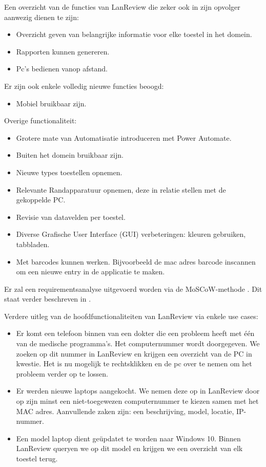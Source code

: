 Een overzicht van de functies van LanReview die zeker ook in zijn opvolger aanwezig dienen te zijn:
\begin{itemize}
    \item  Overzicht geven van belangrijke informatie voor elke toestel in het domein.
    \item Rapporten kunnen genereren.
\item Pc’s bedienen vanop afstand.
\end{itemize}
Er zijn ook enkele volledig nieuwe functies beoogd:
\begin{itemize}
\item Mobiel bruikbaar zijn.
\end{itemize}
Overige functionaliteit:
\begin{itemize}
    \item Grotere mate van Automatisatie introduceren met Power Automate.
    \item Buiten het domein bruikbaar zijn.
    \item Nieuwe types toestellen opnemen.
    \item Relevante Randapparatuur opnemen, deze in relatie stellen met de gekoppelde PC.
    \item Revisie van datavelden per toestel.
    \item Diverse Grafische User Interface (GUI) verbeteringen: kleuren gebruiken, tabbladen.
    \item Met barcodes kunnen werken. Bijvoorbeeld de mac adres barcode inscannen om een nieuwe entry in de applicatie te maken.
\end{itemize}
Er zal een requirementsanalyse uitgevoerd worden via de MoSCoW-methode \parencite{Wikipedia2020}. Dit staat verder beschreven in .

\vspace{5mm}

Verdere uitleg van de hoofdfunctionaliteiten van LanReview via enkele use cases:
\begin{itemize}
    \item Er komt een telefoon binnen van een dokter die een probleem heeft met één van de medische programma's. Het computernummer wordt doorgegeven. We zoeken op dit nummer in LanReview en krijgen een overzicht van de PC in kwestie. Het is nu mogelijk te rechtsklikken en de pc over te nemen om het probleem verder op te lossen.
    \item Er werden nieuwe laptops aangekocht. We nemen deze op in LanReview door op zijn minst een niet-toegewezen computernummer te kiezen samen met het MAC adres. Aanvullende zaken zijn: een beschrijving, model, locatie, IP-nummer.
    \item Een model laptop dient geüpdatet te worden naar Windows 10. Binnen LanReview queryen we op dit model en krijgen we een overzicht van elk toestel terug.
\end{itemize}

